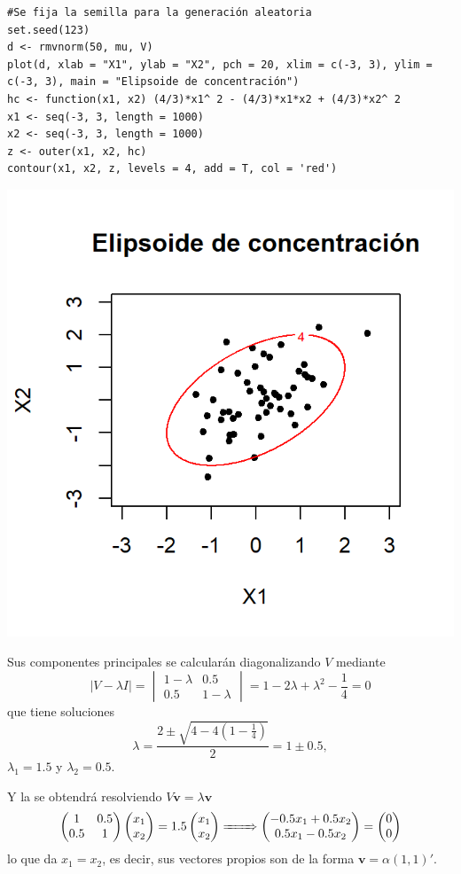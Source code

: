 \begin{lstlisting}
#Se fija la semilla para la generación aleatoria
set.seed(123)
d <- rmvnorm(50, mu, V)
plot(d, xlab = "X1", ylab = "X2", pch = 20, xlim = c(-3, 3), ylim = c(-3, 3), main = "Elipsoide de concentración")
hc <- function(x1, x2) (4/3)*x1^ 2 - (4/3)*x1*x2 + (4/3)*x2^ 2
x1 <- seq(-3, 3, length = 1000)
x2 <- seq(-3, 3, length = 1000)
z <- outer(x1, x2, hc)
contour(x1, x2, z, levels = 4, add = T, col = 'red')
\end{lstlisting}
\begin{center}
	\includegraphics[width=0.6\linewidth]{"Temas/Imágenes/Tema 4/screenshot005"}
\end{center}
Sus componentes principales se calcularán diagonalizando $V$ mediante \[ \left|V-\lambda I\right|=\begin{vmatrix}
	1-\lambda & 0.5\\
	0.5 & 1-\lambda
\end{vmatrix}=1-2\lambda+\lambda^2-\dfrac{1}{4}=0 \] que tiene soluciones \[ \lambda=\dfrac{2\pm\sqrt{4-4(1-\frac{1}{4})}}{2}=1\pm0.5, \]$\lambda_1=1.5$ y $\lambda_2=0.5$.

Y la  se obtendrá resolviendo $V\mathbf{v}=\lambda\mathbf{v}$ \[ \begin{pmatrix}
	1 & 0.5\\
	0.5 & 1
\end{pmatrix}\begin{pmatrix}
x_1\\
x_2
\end{pmatrix}=1.5\begin{pmatrix}
x_1\\
x_2
\end{pmatrix}\xRightarrow{\qquad}\begin{pmatrix}
-0.5x_1+0.5x_2\\
0.5x_1-0.5x_2
\end{pmatrix}=\begin{pmatrix}
0\\
0
\end{pmatrix} \]lo que da $x_1=x_2$, es decir, sus vectores propios son de la forma $\mathbf{v}=\alpha(1,1)'$.


